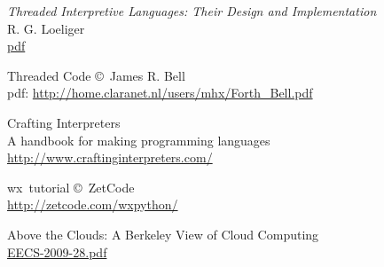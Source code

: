 \begin{thebibliography}{99}
 \emph{Threaded Interpretive Languages: Their Design and
Implementation}\\ R. G. Loeliger \\
\href{http://sinclairql.speccy.org/archivo/docs/books/Threaded_interpretive_languages.pdf}{pdf}

 Threaded Code \copyright\ James R. Bell\\
pdf: \url{http://home.claranet.nl/users/mhx/Forth_Bell.pdf}

 Crafting Interpreters\\
A handbook for making programming languages\\
\url{http://www.craftinginterpreters.com/}

 wx\py\ tutorial \copyright\ ZetCode\\
	\url{http://zetcode.com/wxpython/}

 Above the Clouds: A Berkeley View of Cloud Computing \\
\href{https://www2.eecs.berkeley.edu/Pubs/TechRpts/2009/EECS-2009-28.pdf}{EECS-2009-28.pdf}

\end{thebibliography}
